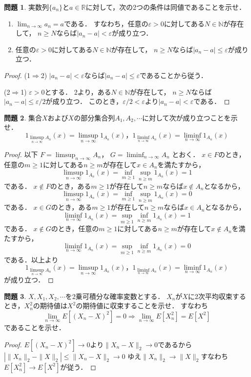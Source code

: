\documentclass{jsarticle}
\theoremstyle{definition}
\newtheorem{qst}{問題}
\begin{document}
\begin{qst}
実数列$\{a_n\}$と$a\in\mathbb{R}$に対して，次の2つの条件は同値であることを示せ．
\begin{enumerate}
\item$\displaystyle\lim_{n\to\infty}a_n=a$である．
すなわち，任意の$\varepsilon>0$に対してある$N\in\mathbb{N}$が存在して，
$n\geq N$ならば$|a_n-a|<\varepsilon$が成り立つ．
\item 任意の$\varepsilon>0$に対してある$N\in\mathbb{N}$が存在して，
$n\geq N$ならば$|a_n-a|\leq\varepsilon$が成り立つ．
\end{enumerate}
\end{qst}
\begin{proof}
(1$\Rightarrow$2)
$|a_n-a|<\varepsilon$ならば$|a_n-a|\leq\varepsilon$であることから従う．

(2$\Rightarrow$1)
$\varepsilon>0$とする．
2より，ある$N\in\mathbb{N}$が存在して，
$n\geq N$ならば$|a_n-a|\leq\varepsilon/2$が成り立つ．
このとき，$\varepsilon/2<\varepsilon$より$|a_n-a|<\varepsilon$である．
\end{proof}

\begin{qst}
集合$X$および$X$の部分集合列$A_1,A_2,\cdots$に対して次が成り立つことを示せ．
\[ 1_{\limsup_{n\to\infty}A_n}(x)=\limsup_{n\to\infty}1_{A_n}(x)，
1_{\liminf_{n\to\infty}A_n}(x)=\liminf_{n\to\infty}1_{A_n}(x) \]
\end{qst}
\begin{proof}
以下
$F=\displaystyle\limsup_{n\to\infty}A_n$，
$G=\displaystyle\liminf_{n\to\infty}A_n$
とおく．
$x\in F$のとき，任意の$m\geq1$に対してある$n\geq m$が存在して$x\in A_n$を満たすから，
\[ \limsup_{n\to\infty}1_{A_n}(x)=\inf_{m\geq1}\sup_{n\geq m}1_{A_n}(x)=1 \]
である．
$x\notin F$のとき，ある$m\geq1$が存在して$n\geq m$ならば$x\notin A_n$となるから，
\[ \limsup_{n\to\infty}1_{A_n}(x)=\inf_{m\geq1}\sup_{n\geq m}1_{A_n}(x)=0 \]
である．
$x\in G$のとき，ある$m\geq1$が存在して$n\geq m$ならば$x\in A_n$となるから，
\[ \liminf_{n\to\infty}1_{A_n}(x)=\sup_{m\geq1}\inf_{n\geq m}1_{A_n}(x)=1 \]
である．
$x\notin G$のとき，任意の$m\geq1$に対してある$n\geq m$が存在して$x\notin A_n$を満たすから，
\[ \liminf_{n\to\infty}1_{A_n}(x)=\sup_{m\geq1}\inf_{n\geq m}1_{A_n}(x)=0 \]
である．以上より
\[ 1_{\limsup_{n\to\infty}A_n}(x)=\limsup_{n\to\infty}1_{A_n}(x)，
1_{\liminf_{n\to\infty}A_n}(x)=\liminf_{n\to\infty}1_{A_n}(x) \]
が成り立つ．
\end{proof}

\begin{qst}
$X,X_1,X_2,\cdots$を2乗可積分な確率変数とする．
$X_n$が$X$に2次平均収束するとき，$X_n^2$の期待値は$X^2$の期待値に収束することを示せ．
すなわち
\[ \lim_{n\to\infty}E[(X_n-X)^2]=0\Rightarrow\lim_{n\to\infty}E[X_n^2]=E[X^2] \]
であることを示せ．
\end{qst}
\begin{proof}
$E[(X_n-X)^2]\to0$より$\|X_n-X\|_2\to0$であるから
$|\|X_n\|_2-\|X\|_2|\leq\|X_n-X\|_2\to0$
ゆえ$\|X_n\|_2\to\|X\|_2$すなわち$E[X_n^2]\to E[X^2]$が従う．
\end{proof}
\end{document}

